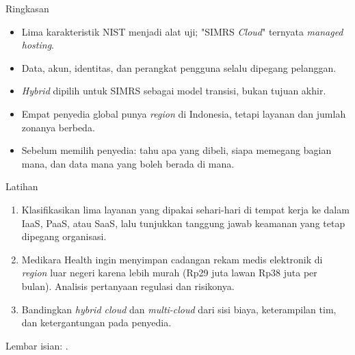 \documentclass[aspectratio=169, table, 12pt]{beamer}
\begin{document}
\begin{frame}{Ringkasan}
  \small
  \begin{itemize}
    \item Lima karakteristik NIST menjadi alat uji; "SIMRS \textit{Cloud}" ternyata
          \textit{managed hosting}.
    \item Data, akun, identitas, dan perangkat pengguna selalu dipegang pelanggan.
    \item \textit{Hybrid} dipilih untuk SIMRS sebagai model transisi, bukan tujuan akhir.
    \item Empat penyedia global punya \textit{region} di Indonesia, tetapi layanan dan jumlah
          zonanya berbeda.
    \item Sebelum memilih penyedia: tahu apa yang dibeli, siapa memegang bagian mana, dan
          data mana yang boleh berada di mana.
  \end{itemize}
\end{frame}

\begin{frame}{Latihan}
  \small
  \begin{enumerate}
    \item Klasifikasikan lima layanan yang dipakai sehari-hari di tempat kerja ke dalam IaaS,
          PaaS, atau SaaS, lalu tunjukkan tanggung jawab keamanan yang tetap dipegang
          organisasi.
    \item Medikara Health ingin menyimpan cadangan rekam medis elektronik di \textit{region}
          luar negeri karena lebih murah (Rp29 juta lawan Rp38 juta per bulan). Analisis
          pertanyaan regulasi dan risikonya.
    \item Bandingkan \textit{hybrid cloud} dan \textit{multi-cloud} dari sisi biaya,
          keterampilan tim, dan ketergantungan pada penyedia.
  \end{enumerate}
  \vspace{4pt}
  {\footnotesize Lembar isian: .}
\end{frame}
\end{document}
